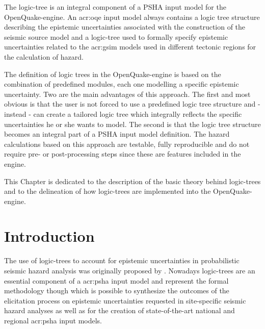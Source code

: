 %
The logic-tree is an integral component of a PSHA input model for the 
OpenQuake-engine. 
%
An \gls{acr:oqe} input model always contains a logic tree structure 
describing the epistemic uncertainties associated with the construction 
of the seismic source model and a logic-tree used to formally specify 
epistemic uncertainties related to the \gls{acr:gsim} models used in 
different tectonic regions for the calculation of hazard.

The definition of logic trees in the OpenQuake-engine is based on
the combination of predefined modules, each one modelling a specific 
epistemic uncertainty.
%
Two are the main advantages of this approach. The first and most obvious  
is that the user is not forced to use a predefined logic tree structure and
- instead - can create a tailored logic tree which integrally 
reflects the specific uncertainties he or she wants to model. 
%
The second is that the logic tree structure becomes an integral part of  
a PSHA input model definition. The hazard calculations based on this approach
are testable, fully reproducible and do not require pre- or 
post-processing steps since these are features included in the engine.

This Chapter is dedicated to the description of the basic theory behind 
logic-trees and to the delineation of how logic-trees are implemented 
into the OpenQuake-engine.
%
\section{Introduction}
The use of logic-trees to account for epistemic uncertainties in  
probabilistic seismic hazard analysis was originally proposed by 
\textcite{kulkarni84}.
%
Nowadays logic-trees are an essential component of a \gls{acr:psha} input
model and represent the formal methodology though which is possible to 
synthesize the outcomes of the elicitation process on epistemic uncertainties
requested in site-specific seismic hazard analyses \parencite{budnitz1997}
as well as for the creation of state\--of\--the\--art national and 
regional \gls{acr:psha} input models. 


